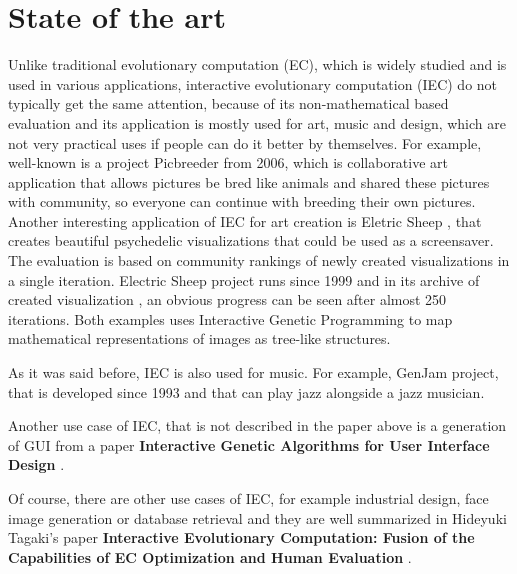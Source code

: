 \chapter{State of the art}

Unlike traditional evolutionary computation (EC), which is widely studied and is used in various applications, interactive evolutionary computation (IEC) do not typically get the same attention, because of its non-mathematical based evaluation and its application is mostly used for art, music and design, which are not very practical uses if people can do it better by themselves. For example, well-known is a project Picbreeder \cite{picbreeder} from 2006, which is collaborative art application that allows pictures be bred like animals and shared these pictures with community, so everyone can continue with breeding their own pictures. Another interesting application of IEC for art creation is Eletric Sheep \cite{electricsheep}, that creates beautiful psychedelic visualizations that could be used as a screensaver. The evaluation is based on community rankings of newly created visualizations in a single iteration. Electric Sheep project runs since 1999 \cite{electricsheep-founded} and in its archive of created visualization \cite{electricsheep-archive}, an obvious progress can be seen after almost 250 iterations. Both examples uses Interactive Genetic Programming to map mathematical representations of images as tree-like structures.

As it was said before, IEC is also used for music. For example, GenJam \cite{genjam} project, that is developed since 1993 and that can play jazz alongside a jazz musician.

Another use case of IEC, that is not described in the paper above is a generation of GUI from a paper \textbf{Interactive Genetic Algorithms for User Interface Design} \cite{igagui}.

Of course, there are other use cases of IEC, for example industrial design, face image generation or database retrieval and they are well summarized in Hideyuki Tagaki's paper \textbf{Interactive Evolutionary Computation: Fusion of the Capabilities of EC Optimization and Human Evaluation} \cite{tagakipaper}.

